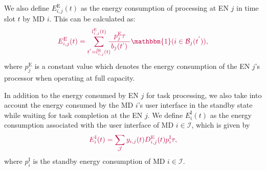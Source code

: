 \documentclass[10pt, journal,letterpaper]{IEEEtran}
\begin{document}
We also define $E_{i,j}^{\text{E}}(t)$ as the energy consumption of processing at EN $j$ in time slot $t$ by MD $i$. This can be calculated as:
\begin{alignat}{1}
	\textcolor{purple}{E_{i,j}^{\text{E}}(t) =  \sum_{t^{'}=\hat{l}_{i,j}^{\text{E}}(t)}^{l_{i,j}^{\text{E}}(t)}\hspace{-2mm}{\, p_j^{\text{E}} \tau \over \,\, b_j(t^{'})\,\,}\mathbbm{1}(i \in \mathcal{B}_j(t^{'})),}  
	\label{15}  
\end{alignat}
where $p_j^{\text{E}}$ is a constant value which denotes the energy consumption of the EN $j$'s processor when operating at full capacity. 

In addition to the energy consumed by EN $j$ for task processing, we also take into account the energy consumed by the MD $i$'s user interface in the standby state while waiting for task completion at the EN $j$. We define $E_{i}^{\text{I}}(t)$ as the energy consumption associated with the user interface of MD $i \in \mathcal{I}$, which is given by
\begin{alignat}{1}
		\textcolor{purple}{E_{i}^{\text{I}}(t) =  \sum_{\mathcal{J}}y_{i,j}(t) D_{i,j}^{\text{E}}(t) p_i^{\text{I}} \tau, }
	\label{16}
\end{alignat}
where $p_i^{\text{I}}$ is the standby energy consumption of MD $i \in \mathcal{I}$.

\end{document}
